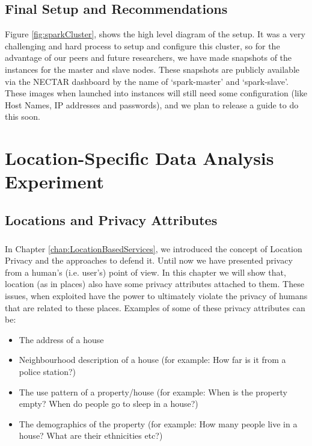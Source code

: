 \documentclass[12pt]{report}
\theoremstyle{named}
\begin{document}
\section{Final Setup and Recommendations}
Figure \ref{fig:sparkCluster}, shows the high level diagram of the setup. It was a very challenging and hard process to setup and configure this cluster, so for the advantage of our peers and future researchers, we have made snapshots of the instances for the master and slave nodes. These snapshots are publicly available via the NECTAR dashboard by the name of `spark-master' and `spark-slave'. These images when launched into instances will still need some configuration (like Host Names, IP addresses and passwords), and we plan to release a guide to do this soon.



\chapter{Location-Specific Data Analysis Experiment}
\label{chap:Experiment}
\section{Locations and Privacy Attributes}
\paragraph{}
In Chapter \ref{chap:LocationBasedServices}, we introduced the concept of Location Privacy and the approaches to defend it. Until now we have presented privacy from a human's (i.e. user's) point of view. In this chapter we will show that, location (as in places) also have some privacy attributes attached to them. These issues, when exploited have the power to ultimately violate the privacy of humans that are related to these places. Examples of some of these privacy attributes can be:
\begin{itemize}
  \item The address of a house
  \item Neighbourhood description of a house (for example: How far is it from a police station?)
  \item The use pattern of a property/house (for example: When is the property empty? When do people go to sleep in a house?) 
  \item The demographics of the property (for example: How many people live in a house? What are their ethnicities etc?)
\end{itemize}
\end{document}
